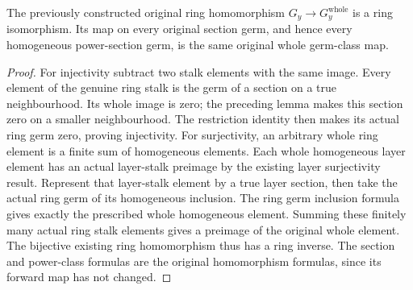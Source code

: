 \begin{theorem}
\label{hir:real-domain-actual-normal-associated-ring-whole-stalk-equivalence}
\leanok
The previously constructed original ring homomorphism
$G_y\longrightarrow G_y^{\mathrm{whole}}$ is a ring isomorphism.
Its map on every original section germ, and hence every homogeneous
power-section germ, is the same original whole germ-class map.
\end{theorem}
\begin{proof}
For injectivity subtract two stalk elements with the same image. Every
element of the genuine ring stalk is the germ of a section on a true
neighbourhood. Its whole image is zero; the preceding lemma makes this
section zero on a smaller neighbourhood. The restriction identity
then makes its actual ring germ zero, proving injectivity.
For surjectivity, an arbitrary whole ring element is a finite sum of
homogeneous elements. Each whole homogeneous layer element has an
actual layer-stalk preimage by the existing layer surjectivity result.
Represent that layer-stalk element by a true layer section, then take
the actual ring germ of its homogeneous inclusion. The ring germ
inclusion formula gives exactly the prescribed whole homogeneous
element. Summing these finitely many actual ring stalk elements gives
a preimage of the original whole element. The bijective existing ring
homomorphism thus has a ring inverse. The section and power-class
formulas are the original homomorphism formulas, since its forward
map has not changed.
\end{proof}
